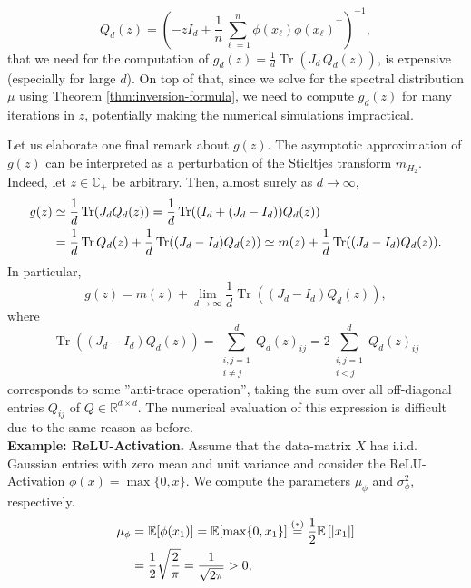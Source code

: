 \documentclass{article}
\begin{document}
\begin{equation}
Q_d(z)=\left(-zI_{d}+\frac{1}{n}\sum_{\ell=1}^n \phi(x_\ell) \phi(x_\ell)^\top\right)^{-1},
\end{equation}
that we need for the computation of $g_d(z)=\frac{1}{d}\operatorname{Tr}(J_d\,Q_d(z))$, is expensive (especially for large $d$). On top of that, since we solve for the spectral distribution $\mu$ using Theorem \ref{thm:inversion-formula}, we need to compute $g_d(z)$ for many iterations in $z$, potentially making the numerical simulations impractical.
\bigskip
\par
Let us elaborate one final remark about $g(z)$. The asymptotic approximation of $g(z)$ can be interpreted as a perturbation of the Stieltjes transform $m_{H_2}$. Indeed, let $z\in\mathbb{C}_+$ be arbitrary. Then, almost surely as $d\to\infty$,
\begin{align}
g(z)&\simeq\frac{1}{d}\operatorname{Tr}(J_{d}Q_{d}(z))=\frac{1}{d}\operatorname{Tr}((I_{d}+(J_{d}-I_{d}))Q_{d}(z)) \notag
\\ &= \frac{1}{d}\operatorname{Tr}Q_{d}(z)+\frac{1}{d}\operatorname{Tr}((J_{d}-I_{d})Q_{d}(z)) \simeq m(z)+\frac{1}{d}\operatorname{Tr}((J_{d}-I_{d})Q_{d}(z)).
\end{align}
In particular,
\begin{equation}
g(z)=m(z)+\lim_{d\to\infty}\frac{1}{d}\operatorname{Tr}((J_{d}-I_{d})Q_{d}(z)),\label{eq:g(z)-formula1}
\end{equation}
where
\begin{equation}
\operatorname{Tr}((J_{d}-I_{d})Q_{d}(z))=\sum_{\substack{i,j=1\\i\neq j}}^{d}Q_{d}(z)_{ij}=2\sum_{\substack{i,j=1\\i<j}}^{d}Q_{d}(z)_{ij}\label{eq:off-diag-formula}
\end{equation}
corresponds to some ''anti-trace operation'', taking the sum over all off-diagonal entries $Q_{ij}$ of $Q\in\mathbb{R}^{d\times d}$. The numerical evaluation of this expression is difficult due to the same reason as before.
\bigskip
\bigskip
\\
\textbf{Example: ReLU-Activation.} Assume that the data-matrix $X$ has i.i.d. Gaussian entries with zero mean and unit variance and consider the ReLU-Activation $\phi(x)=\max\{0,x\}$. We compute the parameters $\mu_\phi$ and $\sigma_\phi^2$, respectively.
\begin{align}
\mu_\phi &= \mathbb{E}[\phi(x_1)] = \mathbb{E}[\max\{0,x_1\}] \stackrel{(*)}{=} \frac{1}{2}\mathbb{E}\left[|x_1|\right] \notag
\\ &= \frac{1}{2}\sqrt{\frac{2}{\pi}}=\frac{1} {\sqrt{2\pi}}>0, \label{eq:half-normal}
\end{align}
\end{document}
